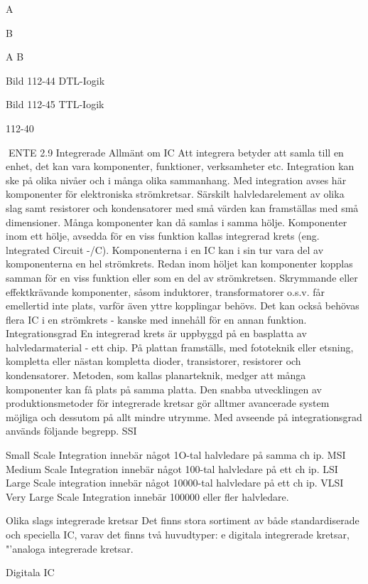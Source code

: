 {{A

B

A
B

Bild 112-44 DTL-Iogik

Bild 112-45 TTL-Iogik

112-40

ENTE
2.9 Integrerade
Allmänt om IC
Att integrera betyder att samla till en enhet,
det kan vara komponenter, funktioner, verksamheter etc. Integration kan ske på olika
nivåer och i många olika sammanhang.
Med integration avses här komponenter
för elektroniska strömkretsar. Särskilt halvledarelement av olika slag samt resistorer
och kondensatorer med små värden kan
framställas med små dimensioner. Många
komponenter kan då samlas i samma hölje.
Komponenter inom ett hölje, avsedda för
en viss funktion kallas integrerad krets (eng.
lntegrated Circuit -/C).
Komponenterna i en IC kan i sin tur vara
del av komponenterna en hel strömkrets.
Redan inom höljet kan komponenter kopplas samman för en viss funktion eller som en
del av strömkretsen. Skrymmande eller effektkrävande komponenter, såsom induktorer, transformatorer o.s.v. får emellertid inte
plats, varför även yttre kopplingar behövs.
Det kan också behövas flera IC i en strömkrets - kanske med innehåll för en annan
funktion.
Integrationsgrad
En integrerad krets är uppbyggd på en basplatta av halvledarmaterial - ett chip. På
plattan framställs, med fototeknik eller etsning, kompletta eller nästan kompletta dioder, transistorer, resistorer och kondensatorer. Metoden, som kallas planarteknik, medger att många komponenter kan få plats på
samma platta.
Den snabba utvecklingen av produktionsmetoder för integrerade kretsar gör alltmer
avancerade system möjliga och dessutom
på allt mindre utrymme. Med avseende på
integrationsgrad används följande begrepp.
SSI

Small Scale Integration innebär något
1O-tal halvledare på samma ch ip.
MSI Medium Scale Integration innebär
något 100-tal halvledare på ett ch ip.
LSI Large Scale integration innebär något
10000-tal halvledare på ett ch ip.
VLSI Very Large Scale Integration innebär
100000 eller fler halvledare.

Olika slags integrerade kretsar
Det finns stora sortiment av både standardiserade och speciella IC, varav det finns två
huvudtyper:
e digitala integrerade kretsar,
"'analoga integrerade kretsar.

Digitala IC

}}
